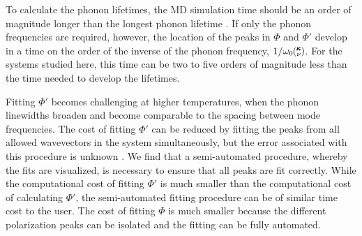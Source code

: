 To calculate the phonon lifetimes, the MD simulation time should be an 
order of magnitude 
longer than the longest phonon lifetime \cite{thomas_water_2010}.  
If only the 
phonon frequencies 
are required, however, the location of the peaks in $\Phi$ and $\Phi'$ 
develop in a time on 
the order of the inverse of the phonon frequency, $1/\omega_0\mspace{-4.0mu}\left(\mspace{-8.0mu} \begin{smallmatrix}&\pmb{\kappa} \\&\nu\end{smallmatrix} \mspace{-3.0mu}\right)$. For the 
systems studied 
here, this time can be two to five orders of magnitude less than the time 
needed to develop 
the lifetimes.

Fitting $\Phi'$ becomes challenging at higher temperatures, when the 
phonon linewidths 
broaden and become comparable to the spacing between mode frequencies. 
The cost of 
fitting $\Phi'$ can be reduced by fitting the peaks from all allowed 
wavevectors in the 
system simultaneously, but the error associated with this procedure is 
unknown 
\cite{shiomi_thermal_2011}. We find that a semi-automated procedure, 
whereby the fits are 
visualized, is necessary to ensure that all peaks are fit correctly.  
While the 
computational cost of fitting $\Phi'$ is much smaller than the 
computational cost of 
calculating $\Phi'$, the semi-automated fitting procedure can be of 
similar time cost 
to the user. The cost of fitting $\Phi$ is much smaller because the 
different polarization 
peaks can be isolated and the fitting can be fully automated.


